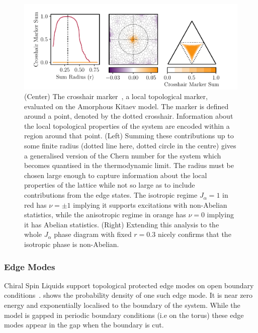 \hypertarget{fig:phase_diagram_chern}{%
\begin{figure}
\centering
\includegraphics[width=1\textwidth,height=\textheight]{figure_code/amk_chapter/results/phase_diagram_chern/phase_diagram_chern}
\caption[{Local Chern Markers}]{(Center) The crosshair marker~\autocite{peru_preprint}, a local topological marker, evaluated on the Amorphous Kitaev model. The marker is defined around a point, denoted by the dotted crosshair. Information about the local topological properties of the system are encoded within a region around that point. (Left) Summing these contributions up to some finite radius (dotted line here, dotted circle in the centre) gives a generalised version of the Chern number for the system which becomes quantised in the thermodynamic limit. The radius must be chosen large enough to capture information about the local properties of the lattice while not so large as to include contributions from the edge states. The isotropic regime \(J_\alpha = 1\) in red has \(\nu = \pm 1\) implying it supports excitations with non-Abelian statistics, while the anisotropic regime in orange has \(\nu = 0\) implying it has Abelian statistics. (Right) Extending this analysis to the whole \(J_\alpha\) phase diagram with fixed \(r = 0.3\) nicely confirms that the isotropic phase is non-Abelian.}
\label{fig:phase_diagram_chern}
\end{figure}
}

\hypertarget{edge-modes}{%
\subsubsection{Edge Modes}\label{edge-modes}}

Chiral Spin Liquids support topological protected edge modes on open boundary conditions~\autocite{qi_general_2006}.  shows the probability density of one such edge mode. It is near zero energy and exponentially localised to the boundary of the system. While the model is gapped in periodic boundary conditions (i.e on the torus) these edge modes appear in the gap when the boundary is cut.

